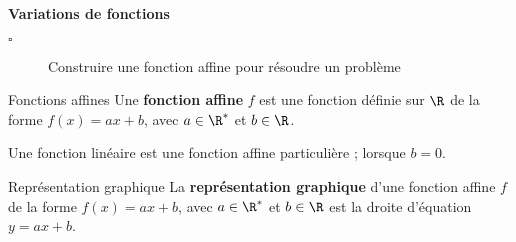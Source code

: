 \begin{titre}

\end{titre}


\begin{CpsCol}
\textbf{Variations de fonctions}
\begin{description}
\item[$\square$] Construire une fonction affine pour résoudre un problème
\end{description}
\end{CpsCol}



\begin{DefT}{Fonctions affines}
Une \textbf{fonction affine} $f$ est une fonction définie sur $\R$ de la forme $f(x)=ax+b$, avec $a\in \R^*$ et $b \in \R$.
\end{DefT}



\begin{Rq}
Une fonction linéaire est une fonction affine particulière ; lorsque $b=0$.
\end{Rq}


\begin{DefT}{Représentation graphique} 
La \textbf{représentation graphique} d'une fonction affine $f$ de la forme $f(x)=ax+b$, avec $a\in \R^*$ et $b \in \R$ est la droite d'équation $y=ax+b$. 
\end{DefT}










